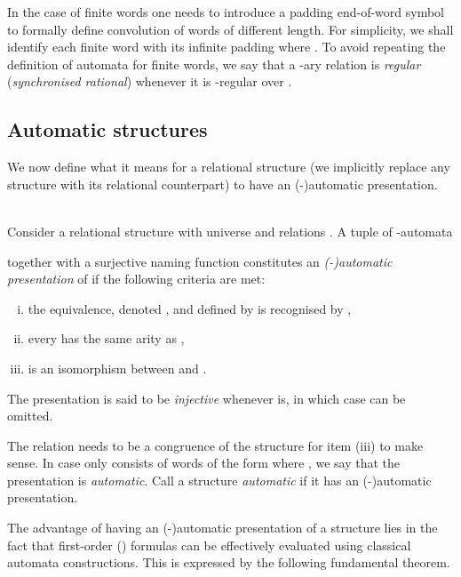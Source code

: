 \documentclass{stacs_proc}
\begin{document}
In the case of finite words one needs to introduce a padding
end-of-word symbol  
to formally define convolution of words of different length. 
For simplicity, we shall identify each finite word 
with its infinite padding  
where . 
To avoid repeating the definition of automata for finite words,
we say that a -ary relation  
is \emph{regular} (\emph{synchronised rational}) whenever 
it is -regular over .


\vskip-0.3cm
\subsection{Automatic structures}

We now define what it means for a relational structure (we implicitly replace
any structure with its relational counterpart) to have an (-)automatic
presentation. 

\begin{definition} \label{def_as} ~\\
Consider a relational structure  with universe
 and relations .
A tuple of -automata 

together with a surjective naming function 
constitutes an \emph{(-)automatic presentation} of 
if the following criteria are met: 
\begin{enumerate}[(i)]
\item the equivalence, denoted , and defined by  
   is recognised by ,
\item every  has the same arity as ,
\item  is an isomorphism between 
    and .
\end{enumerate}
The presentation is said to be \emph{injective} whenever  is, 
in which case  can be omitted.
\end{definition}

The relation  needs to be a congruence of the structure 
 for item (iii) to make sense. 
In case  only consists of words of the form  where 
, we say that the presentation is {\em automatic}.  
Call a structure {\em automatic} if it has an (-)automatic 
presentation.








The advantage of having an (-)automatic presentation of a structure 
lies in the fact that first-order () formulas can be effectively evaluated
using classical automata constructions. This is expressed by the following 
fundamental theorem.
\end{document}
